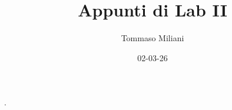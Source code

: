 \documentclass[a4paper, oneside]{article}
\title{Appunti di Lab II}
\author{Tommaso Miliani}
\date{02-03-26}
\begin{document}
                {}          %
                {}          %
                {\slshape}  %
                {}          %
                {\bfseries} %
                {.}         %
                {\newline}  %
                {}          %
\theoremstyle{theoremEnv}

\newtheorem{definition}{Definizione}[section]
\newtheorem{theorem}{Teorema}[section]
\newtheorem{lemma}{Proposizione}[section]
\newtheorem{observation}{Osservazione}[section]
\newtheorem{corollary}{Corollario}[theorem]
\newtheorem{example}{Esempio}[section]
\newtheorem{remark}{Enunciato}[section]

\maketitle
\end{document}
